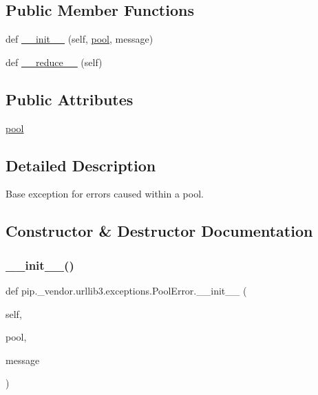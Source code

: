 \subsection*{Public Member Functions}
\begin{DoxyCompactItemize}
\item 
def \hyperlink{classpip_1_1__vendor_1_1urllib3_1_1exceptions_1_1PoolError_ae810ee272424577cffcbe3d578034517}{\+\_\+\+\_\+init\+\_\+\+\_\+} (self, \hyperlink{classpip_1_1__vendor_1_1urllib3_1_1exceptions_1_1PoolError_a2953f9b92fd5cbcd2155a2aac9ef57c9}{pool}, message)
\item 
def \hyperlink{classpip_1_1__vendor_1_1urllib3_1_1exceptions_1_1PoolError_a87127ac2102ced768833309763ecf7b5}{\+\_\+\+\_\+reduce\+\_\+\+\_\+} (self)
\end{DoxyCompactItemize}
\subsection*{Public Attributes}
\begin{DoxyCompactItemize}
\item 
\hyperlink{classpip_1_1__vendor_1_1urllib3_1_1exceptions_1_1PoolError_a2953f9b92fd5cbcd2155a2aac9ef57c9}{pool}
\end{DoxyCompactItemize}


\subsection{Detailed Description}
\begin{DoxyVerb}Base exception for errors caused within a pool.\end{DoxyVerb}
 

\subsection{Constructor \& Destructor Documentation}
\mbox{\label{classpip_1_1__vendor_1_1urllib3_1_1exceptions_1_1PoolError_ae810ee272424577cffcbe3d578034517}} 
\subsubsection{\texorpdfstring{\+\_\+\+\_\+init\+\_\+\+\_\+()}{\_\_init\_\_()}}
{\footnotesize\ttfamily def pip.\+\_\+vendor.\+urllib3.\+exceptions.\+Pool\+Error.\+\_\+\+\_\+init\+\_\+\+\_\+ (\begin{DoxyParamCaption}\item[{}]{self,  }\item[{}]{pool,  }\item[{}]{message }\end{DoxyParamCaption})}



